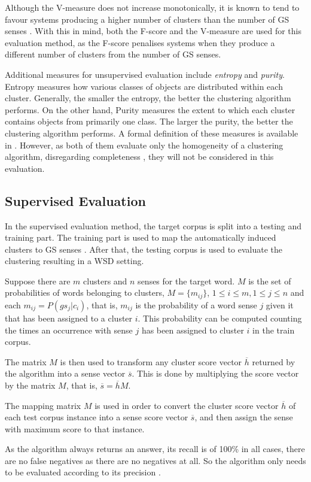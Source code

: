 Although the V-measure does not increase monotonically, it is known to tend to
favour systems producing a higher number of clusters than the number of \ac{GS}
senses \citep{manandhar2010semeval}. With this in mind, both the F-score and the
V-measure are used for this evaluation method, as the F-score penalises systems
when they produce a different number of clusters from the number of \ac{GS}
senses.

Additional measures for unsupervised evaluation include \textit{entropy} and
\textit{purity}. Entropy measures how various classes of objects are
distributed within each cluster. Generally, the smaller the entropy, the better
the clustering algorithm performs. On the other hand, Purity measures the extent
to which each cluster contains objects from primarily one class. The larger the
purity, the better the clustering algorithm performs. A formal definition of
these measures is available in \citep{zhao2005hierarchical}. However, as both of
them evaluate only the homogeneity of a clustering algorithm, disregarding
completeness \citep{manandhar2009semeval}, they will not be considered in this
evaluation.

\subsection{Supervised Evaluation}
\label{subsec:supeval}

In the supervised evaluation method, the target corpus is split into a testing
and training part. The training part is used to map the automatically induced
clusters to \ac{GS} senses \citep{agirre2006evaluating}. After that, the testing
corpus is used to evaluate the clustering resulting in a \ac{WSD} setting.

Suppose there are $m$ clusters and $n$ senses for the target word. $M$ is the
set of probabilities of words belonging to clusters, $M = \{m_{ij}\}$, $1 \leq i
\leq m, 1 \leq j \leq n$ and each $m_{ij} = P(gs_j|c_i)$, that is, $m_{ij}$ is
the probability of a word sense $j$ given it that has been assigned to a cluster
$i$. This probability can be computed counting the times an occurrence with
sense $j$ has been assigned to cluster $i$ in the train corpus.

The matrix $M$ is then used to transform any cluster score vector $\overline{h}$
returned by the algorithm into a sense vector $\overline{s}$. This is done by
multiplying the score vector by the matrix $M$, that is, $\overline{s} =
\overline{h}M$.

The mapping matrix $M$ is used in order to convert the cluster score vector
$\overline{h}$ of each test corpus instance into a sense score vector
$\overline{s}$, and then assign the sense with maximum score to that instance.

As the algorithm always returns an answer, its recall is of 100\% in all
cases, there are no false negatives as there are no negatives at all. So the
algorithm only needs to be evaluated according to its precision
\citep{agirre2006evaluating}.



